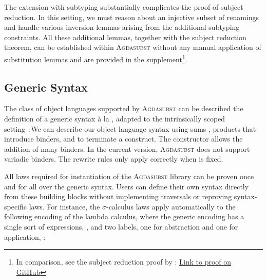 \documentclass[screen,nonacm]{acmart}
\begin{document}
The extension with subtyping substantially complicates the proof of subject
reduction. In this setting, we must reason about an injective subset of
renamings and handle various inversion lemmas arising from the additional
subtyping constraints. All these additional lemmas, together with the subject
reduction theorem, can be established within \textsc{Agdasubst} without any
manual application of substitution lemmas and are provided in the
supplement\footnote{In comparison, see the subject reduction proof by
      \citet{saffrich:LIPIcs.ITP.2024.32}:
      \href{https://github.com/m0rphism/kitty/blob/bc86948c60f2d827593ad23e539197f9660178aa/src/Kitty/Examples/SystemFSub/SubjectReduction.agda\#L308}{Link
            to proof on GitHub}}.

\subsection{Generic Syntax}\label{sec:ext-uni}
The class of object languages supported by \textsc{Agdasubst} can be described
the definition of a generic syntax à la
\citet{allais2021typescopesafeuniverse}, adapted to the intrinsically scoped
setting~\cite{saffrich:LIPIcs.ITP.2024.32}:\GDesc{}We can describe our object
language syntax using sums , products
 that introduce binders, and
 to terminate a construct. The
 constructor allows the addition of 
many binders. In the current version, \textsc{Agdasubst} does not support
variadic binders. The rewrite rules only apply correctly when  is
fixed.

All laws required for instantiation of the \textsc{Agdasubst} library can be
proven once and for all over the generic syntax. Users can define their own
syntax directly from these building blocks without implementing traversals or
reproving syntax-specific laws. For instance, the $σ$-calculus laws apply
automatically to the following encoding of the lambda calculus, where the
generic encoding has a single sort of expressions, \GSort{}, and two labels,
one for abstraction and one for application, \GLabel{}:

\noindent\begin{minipage}[t]{0.48\linewidth}
      \raggedright{}
      \GDescL{}
\end{minipage}
\begin{minipage}[t]{0.48\linewidth}
      \raggedright{}
      \GPattern{}
\end{minipage}
\end{document}
